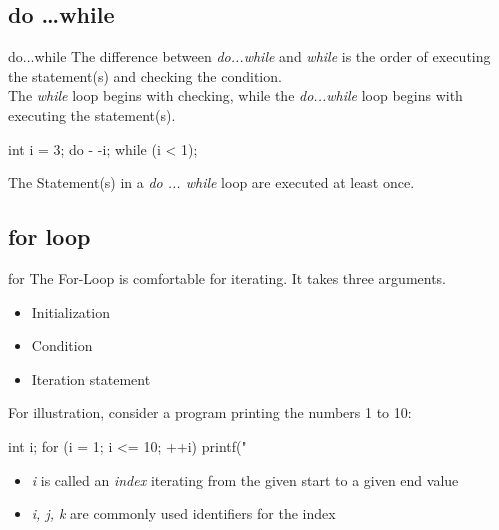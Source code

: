 \documentclass[10pt,graphics,aspectratio=169,table]{beamer}
\begin{document}
\subsection{do \ldots while}

\begin{frame}[fragile]{do...while}
	The difference between \textit{do...while} and \textit{while} is the order of executing the statement(s) and checking the condition.\\
	\bigskip
	The \textit{while} loop begins with checking, while the \textit{do...while} loop begins with executing the statement(s).
	\begin{codeblock}
int i = 3;
do {
	- -i;
} while (i < 1);
\end{codeblock}
	\bigskip
	The Statement(s) in a \textit{do ... while} loop are executed at least once.
\end{frame}

\subsection{for loop}

\begin{frame}[fragile]{for}
	The For-Loop is comfortable for iterating. It takes three arguments.
	\begin{itemize}
		\item Initialization
		\item Condition
		\item Iteration statement
	\end{itemize}
	\bigskip
	For illustration, consider a program printing the numbers 1 to 10:
	\begin{codeblock}
int i;
for (i = 1; i <= 10; ++i)
	{printf("%
}
\end{codeblock}
	\begin{itemize}
		\item \textit{i} is called an \textit{index} iterating from the given start to a given end value
		\item \textit{i, j, k} are commonly used identifiers for the index
	\end{itemize}
\end{frame}
\end{document}
